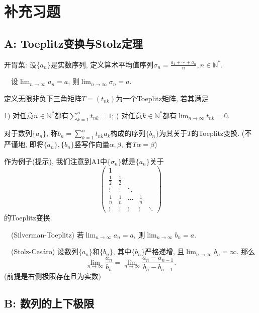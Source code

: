 \newpage
\section*{补充习题} \label{sec:ex3.1}

\subsection*{A: Toeplitz变换与Stolz定理}

开胃菜: 设$\{ a_n \}$是实数序列, 定义算术平均值序列$\sigma _n = \frac{a_1+\cdots + a_n}{n}, n \in \mathbb{N}^{*}$. 
\vspace{1em}

~~设$\lim_{n\to \infty} a_n=a$, 则$\lim_{n\to \infty} \sigma _n=a$. 
\vspace{1em}

定义无限非负下三角矩阵$T=(t_{nk})$为一个Toeplitz矩阵, 若其满足

1) 对任意$n \in \mathbb{N}^{*}$都有$\sum_{k=1}^{n} t_{nk}=1$; ) 对任意$k \in \mathbb{N}^{*}$都有$\lim_{n\to \infty} t_{nk}=0$.

对于数列$\{ a_n \}$, 称$b_n=\sum_{k=1}^{n} t_{nk}a_k$构成的序列$\{ b_n \}$为其关于$T$的Toeplitz变换. (不严谨地, 即将$\{ a_n \},\{ b_n \}$竖写作向量$\alpha ,\beta$, 有$T\alpha = \beta$)

作为例子(提示), 我们注意到A1中$\{ \sigma _n \}$就是$\{ a_n \}$关于$$\begin{pmatrix}
 1 &  &  &  & \\
 \frac{1}{2}  & \frac{1}{2} &  &  & \\
 \vdots & \vdots & \ddots &  & \\
 \frac{1}{n}  & \frac{1}{n} & \cdots & \frac{1}{n} & \\
 \vdots & \vdots & \vdots & \vdots & \ddots
\end{pmatrix}$$的Toeplitz变换. 
\vspace{1em}

~~(Silverman-Toeplitz) 若$\lim_{n\to \infty} a_n=a$, 则$\lim_{n\to \infty} b_n=a$. 
\vspace{1em}

~~(Stolz-Cesáro) 设数列$\{ a_n \}$和$\{ b_n \}$, 其中$\{ b_n \}$严格递增, 且$\lim_{n\to \infty} b_n = \infty$. 那么$$\lim_{n\to \infty} \frac{a_n}{b_n} = \lim_{n\to \infty} \frac{a_n-a_{n-1}}{b_n-b_{n-1}}. $$
(前提是右侧极限存在且为实数)
\vspace{1em}

\subsection*{B: 数列的上下极限}

